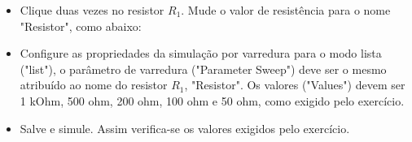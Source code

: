 
\begin{itemize}
    \item Clique duas vezes no resistor $R_1$. Mude o valor de resistência para o nome "Resistor", como abaixo:
\end{itemize}


\begin{itemize}
    \item Configure as propriedades da simulação por varredura para o modo lista ("list"), o parâmetro de varredura ("Parameter Sweep") deve ser o mesmo atribuído ao nome do resistor $R_1$, "Resistor". Os valores ("Values") devem ser 1 kOhm,
    500 ohm, 200 ohm, 100 ohm e 50 ohm, como exigido pelo exercício.
\end{itemize}



\begin{itemize}
    \item Salve e simule. Assim verifica-se os valores exigidos pelo exercício.
\end{itemize}

